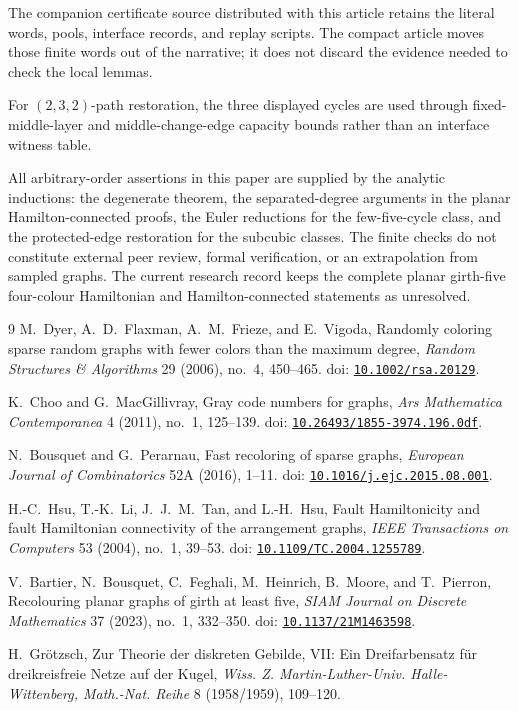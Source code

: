 \documentclass[11pt]{article}
\newcommand{\doi}[1]{doi: \href{https://doi.org/#1}{\nolinkurl{#1}}}
\theoremstyle{remark}
\numberwithin{equation}{section}
\numberwithin{table}{section}
\begin{document}
The companion certificate source distributed with this article retains the
literal words, pools, interface records, and replay scripts.  The compact
article moves those finite words out of the narrative; it does not discard
the evidence needed to check the local lemmas.

For $(2,3,2)$-path restoration, the three displayed cycles are used
through fixed-middle-layer and middle-change-edge capacity bounds
rather than an interface witness table.

All arbitrary-order assertions in this paper are supplied by the analytic inductions: the degenerate theorem, the separated-degree arguments in the planar Hamilton-connected proofs, the Euler reductions for the few-five-cycle class, and the protected-edge restoration for the subcubic classes.  The finite checks do not constitute external peer review, formal verification, or an extrapolation from sampled graphs.  The current research record keeps the complete planar girth-five four-colour Hamiltonian and Hamilton-connected statements as unresolved.


\begin{thebibliography}{9}
M.~Dyer, A.~D.~Flaxman, A.~M.~Frieze, and E.~Vigoda,
\newblock Randomly coloring sparse random graphs with fewer colors than the maximum degree,
\newblock \emph{Random Structures \& Algorithms} 29 (2006), no.~4, 450--465.
\newblock \doi{10.1002/rsa.20129}.

K.~Choo and G.~MacGillivray,
\newblock Gray code numbers for graphs,
\newblock \emph{Ars Mathematica Contemporanea} 4 (2011), no.~1, 125--139.
\newblock \doi{10.26493/1855-3974.196.0df}.

N.~Bousquet and G.~Perarnau,
\newblock Fast recoloring of sparse graphs,
\newblock \emph{European Journal of Combinatorics} 52A (2016), 1--11.
\newblock \doi{10.1016/j.ejc.2015.08.001}.

H.-C.~Hsu, T.-K.~Li, J.~J.~M.~Tan, and L.-H.~Hsu,
\newblock Fault Hamiltonicity and fault Hamiltonian connectivity of the arrangement graphs,
\newblock \emph{IEEE Transactions on Computers} 53 (2004), no.~1, 39--53.
\newblock \doi{10.1109/TC.2004.1255789}.

V.~Bartier, N.~Bousquet, C.~Feghali, M.~Heinrich, B.~Moore, and T.~Pierron,
\newblock Recolouring planar graphs of girth at least five,
\newblock \emph{SIAM Journal on Discrete Mathematics} 37 (2023), no.~1, 332--350.
\newblock \doi{10.1137/21M1463598}.

H.~Gr\"otzsch,
\newblock Zur Theorie der diskreten Gebilde, VII: Ein Dreifarbensatz f\"ur dreikreisfreie Netze auf der Kugel,
\newblock \emph{Wiss. Z. Martin-Luther-Univ. Halle-Wittenberg, Math.-Nat. Reihe} 8 (1958/1959), 109--120.
\end{thebibliography}
\end{document}
